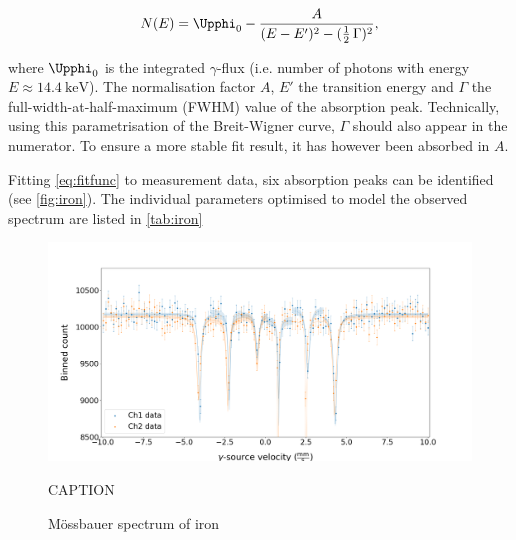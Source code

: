 \begin{equation}
\label{eq:fitfunc}
N(E) = \Upphi_0 - \frac{A}{(E-E')^2 - (\frac{1}{2}\,\Gamma)^2},
\end{equation}

where $\Upphi_0$ is the integrated $\gamma$-flux (i.e. number of photons with energy 
$E\approx\SI{14.4}{\kilo\electronvolt}$). The normalisation factor $A$, $E'$ the 
transition energy and $\Gamma$ the full-width-at-half-maximum (FWHM) value of the 
absorption peak. Technically, using this parametrisation of the Breit-Wigner curve, 
$\Gamma$ should also appear in the numerator. To ensure a more stable fit result, 
it has however been absorbed in $A$.

Fitting \autoref{eq:fitfunc} to measurement data, six absorption peaks can be 
identified (see \autoref{fig:iron}). The individual parameters optimised to model
the observed spectrum are listed in \autoref{tab:iron}

\begin{figure}
	\label{fig:iron}
	\includegraphics[width=1.0\textwidth]{./fig/Iron.png}
	\caption{Mössbauer spectrum of iron}{CAPTION}
\end{figure}


